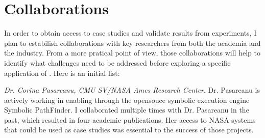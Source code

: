\documentclass[10pt]{article}
\newcounter{list}
\begin{document}
\vspace{-4mm}
\section{Collaborations}




  In order to obtain access to case studies and validate results from
  experiments, I plan to estabilish collaborations with key
  researchers from both the academia and the industry. From a more
  pratical point of view, those collaborations will help to identify
  what challenges need to be addressed before exploring a specific
  application of \PSE{}. Here is an initial list:

  
  \textit{Dr. Corina Pasareanu, CMU SV/NASA Ames Research
    Center}. Dr. Pasareanu is actively working in enabling \PSE{}
  through the opensouce symbolic execution engine Symbolic
  PathFinder. I collaborated multiple times with Dr. Pasareanu in the
  past, which resulted in four academic publications. Her access to
  NASA systems that could be used as case studies was essential to the
  success of those projects.
\end{document}

